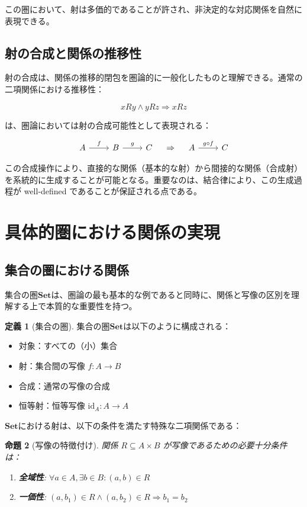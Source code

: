\documentclass[11pt,a4paper,twocolumn]{ltjsarticle}
\theoremstyle{definition}
\newtheorem{definition}{定義}[section]
\theoremstyle{plain}
\newtheorem{proposition}[definition]{命題}
\newcommand{\Set}{\mathbf{Set}}
\newcommand{\id}{\mathrm{id}}
\begin{document}
この圏において、射は多価的であることが許され、非決定的な対応関係を自然に表現できる。

\subsection{射の合成と関係の推移性}

射の合成は、関係の推移的閉包を圏論的に一般化したものと理解できる。通常の二項関係における推移性：

\[
xRy \land yRz \Rightarrow xRz
\]

は、圏論においては射の合成可能性として表現される：

\[
\begin{tikzcd}
A \arrow[r, "f"] & B \arrow[r, "g"] & C
\end{tikzcd}
\quad \Rightarrow \quad
\begin{tikzcd}
A \arrow[r, "g \circ f"] & C
\end{tikzcd}
\]

この合成操作により、直接的な関係（基本的な射）から間接的な関係（合成射）を系統的に生成することが可能となる。重要なのは、結合律により、この生成過程が well-defined であることが保証される点である。

\section{具体的圏における関係の実現}

\subsection{集合の圏における関係}

集合の圏$\Set$は、圏論の最も基本的な例であると同時に、関係と写像の区別を理解する上で本質的な重要性を持つ。

\begin{definition}[集合の圏]
集合の圏$\Set$は以下のように構成される：
\begin{itemize}
\item 対象：すべての（小）集合
\item 射：集合間の写像 $f: A \to B$
\item 合成：通常の写像の合成
\item 恒等射：恒等写像 $\id_A: A \to A$
\end{itemize}
\end{definition}

$\Set$における射は、以下の条件を満たす特殊な二項関係である：

\begin{proposition}[写像の特徴付け]
関係 $R \subseteq A \times B$ が写像であるための必要十分条件は：
\begin{enumerate}
\item \textbf{全域性}: $\forall a \in A, \exists b \in B: (a, b) \in R$
\item \textbf{一価性}: $(a, b_1) \in R \land (a, b_2) \in R \Rightarrow b_1 = b_2$
\end{enumerate}
\end{proposition}
\end{document}
